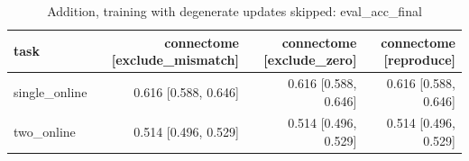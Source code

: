 \begin{table}[t]
\centering
\small
\begin{tabular}{lrrr}
\toprule
task & connectome [exclude\_mismatch] & connectome [exclude\_zero] & connectome [reproduce] \\
\midrule
single\_online & 0.616 [0.588, 0.646] & 0.616 [0.588, 0.646] & 0.616 [0.588, 0.646] \\
two\_online & 0.514 [0.496, 0.529] & 0.514 [0.496, 0.529] & 0.514 [0.496, 0.529] \\
\bottomrule
\end{tabular}
\caption{Addition, training with degenerate updates skipped: eval\_acc\_final}
\label{tab:kc_diag_eval_acc_final}
\end{table}
